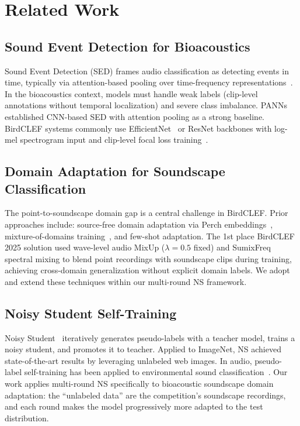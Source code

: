\documentclass[journal]{IEEEtran}
\begin{document}
\section{Related Work}

\subsection{Sound Event Detection for Bioacoustics}

Sound Event Detection (SED) frames audio classification as detecting events in time, typically via attention-based pooling over time-frequency representations~\cite{kong2020panns}.
In the bioacoustics context, models must handle weak labels (clip-level annotations without temporal localization) and severe class imbalance.
PANNs~\cite{kong2020panns} established CNN-based SED with attention pooling as a strong baseline.
BirdCLEF systems commonly use EfficientNet~\cite{tan2019efficientnet} or ResNet backbones with log-mel spectrogram input and clip-level focal loss training~\cite{kahl2021birdclef}.

\subsection{Domain Adaptation for Soundscape Classification}

The point-to-soundscape domain gap is a central challenge in BirdCLEF.
Prior approaches include: source-free domain adaptation via Perch embeddings~\cite{hamer2022perch}, mixture-of-domains training~\cite{birdclef2025_1st}, and few-shot adaptation.
The 1st place BirdCLEF 2025 solution used wave-level audio MixUp ($\lambda=0.5$ fixed) and SumixFreq spectral mixing to blend point recordings with soundscape clips during training, achieving cross-domain generalization without explicit domain labels.
We adopt and extend these techniques within our multi-round NS framework.

\subsection{Noisy Student Self-Training}

Noisy Student~\cite{xie2020self} iteratively generates pseudo-labels with a teacher model, trains a noisy student, and promotes it to teacher.
Applied to ImageNet, NS achieved state-of-the-art results by leveraging unlabeled web images.
In audio, pseudo-label self-training has been applied to environmental sound classification~\cite{gidaris2018unsupervised}.
Our work applies multi-round NS specifically to bioacoustic soundscape domain adaptation: the ``unlabeled data'' are the competition's soundscape recordings, and each round makes the model progressively more adapted to the test distribution.
\end{document}
